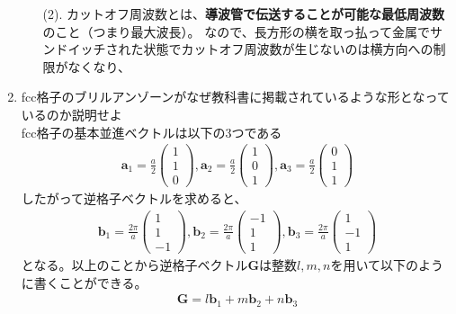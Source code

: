 \documentclass[a4paper,11pt,dvipdfmx]{jsarticle}
\begin{document}
\begin{enumerate}
\begin{itemize}
      \item[(2).] カットオフ周波数とは、\textbf{導波管で伝送することが可能な最低周波数}のこと（つまり最大波長）。
      なので、長方形の横を取っ払って金属でサンドイッチされた状態でカットオフ周波数が生じないのは横方向への制限がなくなり、
    \end{itemize}
    \item fcc格子のブリルアンゾーンがなぜ教科書に掲載されているような形となっているのか説明せよ
      \\ 
      fcc格子の基本並進ベクトルは以下の3つである
      \begin{align*}
        \boldsymbol{a}_1 = \frac{a}{2}\begin{pmatrix} 1 \\ 1 \\ 0\end{pmatrix}, 
        \boldsymbol{a}_2 = \frac{a}{2}\begin{pmatrix} 1 \\ 0 \\ 1\end{pmatrix}, 
        \boldsymbol{a}_3 = \frac{a}{2}\begin{pmatrix} 0 \\ 1 \\ 1\end{pmatrix}
      \end{align*}
      したがって逆格子ベクトルを求めると、
      \begin{align*}
        \boldsymbol{b}_1 = \frac{2 \pi}{a} \begin{pmatrix}1 \\ 1 \\ -1\end{pmatrix}, 
        \boldsymbol{b}_2 = \frac{2 \pi}{a} \begin{pmatrix}-1 \\ 1 \\ 1\end{pmatrix}, 
        \boldsymbol{b}_3 = \frac{2 \pi}{a} \begin{pmatrix}1 \\ -1 \\ 1\end{pmatrix}
      \end{align*}
      となる。以上のことから逆格子ベクトル$\boldsymbol{G}$は整数$l, m, n$を用いて以下のように書くことができる。
      \begin{align*}
        \boldsymbol{G} = l \boldsymbol{b}_1 + m \boldsymbol{b}_2 + n \boldsymbol{b}_3
      \end{align*}

\end{enumerate}
\end{document}
